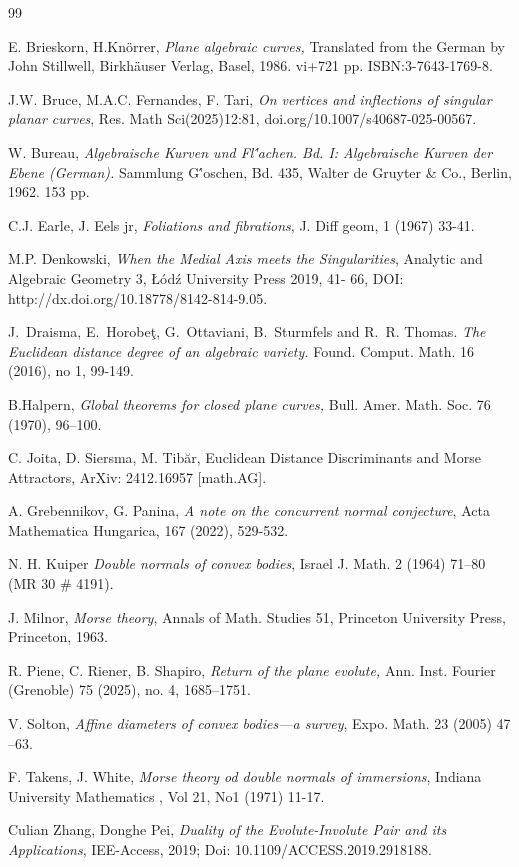 \documentclass[12pt,a4,twoside]{amsart}
\newtheorem*{main lemma}{The main lemma}
\begin{document}
 
\begin{thebibliography}{99}


 E. Brieskorn, H.Knörrer, 
{\em Plane algebraic curves,}
Translated from the German by John Stillwell,
Birkhäuser Verlag, Basel, 1986. vi+721 pp.
ISBN:3-7643-1769-8.

 J.W. Bruce, M.A.C. Fernandes, F. Tari, {\em  On vertices and inflections of singular planar curves}, Res. Math Sci(2025)12:81, doi.org/10.1007/s40687-025-00567.

  W. Bureau, {\em Algebraische Kurven und Fl\''{a}chen. Bd. I: Algebraische Kurven der Ebene (German).}
Sammlung G\''oschen, Bd. 435,
Walter de Gruyter \& Co., Berlin, 1962. 153 pp.
    

 C.J. Earle, J. Eels jr, {\em Foliations and fibrations}, J. Diff geom, 1 (1967) 33-41.

 M.P. Denkowski, {\em    When the Medial Axis meets the Singularities},   Analytic and Algebraic Geometry 3, Łódź University Press 2019, 41- 66, DOI: http://dx.doi.org/10.18778/8142-814-9.05.



J.~Draisma, E.~Horobe\c{t}, G.~Ottaviani, B.~Sturmfels and R.~R. Thomas.
 \emph{The Euclidean distance degree of an algebraic variety.}
 Found. Comput. Math. 16  (2016), no 1, 99-149.
 


 B.Halpern, {\em Global theorems for closed plane curves,}  
Bull. Amer. Math. Soc. 76 (1970), 96–100.



 C. Joita, D. Siersma, M. Tib\u{a}r,  Euclidean Distance Discriminants and Morse Attractors, ArXiv: 2412.16957 [math.AG].

 A. Grebennikov, G. Panina,  {\em A note on the concurrent normal conjecture}, Acta Mathematica
Hungarica, 167 (2022), 529-532.


 N. H. Kuiper \emph{ Double normals of convex bodies}, Israel J. Math. 2 (1964) 71–80 (MR 30 \# 4191).


  J. Milnor, {\em  Morse theory}, Annals of Math. Studies 51, Princeton University Press, Princeton, 1963.


R. Piene, C. Riener, B. Shapiro,  \emph{Return of the plane evolute,} 
Ann. Inst. Fourier (Grenoble) 75 (2025), no. 4, 1685–1751.

V. Solton, \emph{Affine diameters of convex bodies—a survey},  Expo. Math. 23 (2005) 47 –63.

F. Takens, J. White, \emph{Morse theory od double normals of immersions}, Indiana University Mathematics  , Vol 21, No1 (1971) 11-17.

 Culian Zhang, Donghe Pei, {\em Duality of the Evolute-Involute Pair and its Applications}, IEE-Access, 2019; Doi: 10.1109/ACCESS.2019.2918188.







\end{thebibliography}
\end{document}
